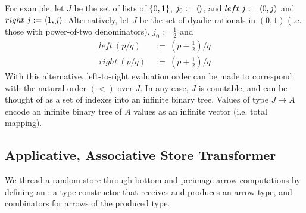 \documentclass{llncs}
\begin{document}
For example, let $J$ be the set of lists of $\{{0,1}\}$, $j_0 := \langle{}\rangle$, and $left~j := \langle{0,j}\rangle$ and $right~j := \langle{1,j}\rangle$.
Alternatively, let $J$ be the set of dyadic rationals in $(0,1)$ (i.e. those with power-of-two denominators), $j_0 := \tfrac{1}{2}$ and
\begin{equation}
\begin{aligned}
	left~(p/q) &\ := \ (p-\tfrac{1}{2})/q
\\
	right~(p/q) &\ := \ (p+\tfrac{1}{2})/q
\end{aligned}
\end{equation}
With this alternative, left-to-right evaluation order can be made to correspond with the natural order $(<)$ over $J$.
In any case, $J$ is countable, and can be thought of as a set of indexes into an infinite binary tree.
Values of type $J \to A$ encode an infinite binary tree of $A$ values as an infinite vector (i.e. total mapping).

\subsection{Applicative, Associative Store Transformer}

We thread a random store through bottom and preimage arrow computations by defining an : a type constructor that receives and produces an arrow type, and combinators for arrows of the produced type.
\end{document}
